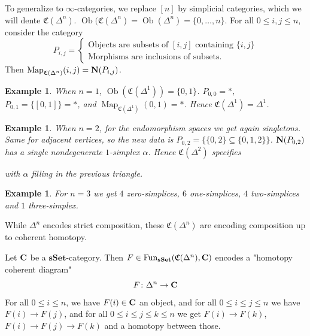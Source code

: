 \documentclass[A4paper, british, reqno]{amsart}
\theoremstyle{darkgreentheorem}
\theoremstyle{darkbluedefinition}
\theoremstyle{darkredexample}
\newtheorem{exa}[thm]{Example}
\theoremstyle{remark}
\DeclareMathOperator{\Fun}{Fun}
\DeclareMathOperator{\Ob}{Ob}
\DeclareMathOperator{\Map}{Map}
\newcommand{\sSet}{\mathbf{sSet}}
\newcommand{\1}{\mathbbm{1}}
\newcommand{\sub}{\subseteq}
\begin{document}
To generalize to $\infty$-categories, we replace $[n]$ by simplicial categories, which we will dente $\mathfrak{C}(\Delta^{n})$.
$\Ob(\mathfrak{C}(\Delta^{n})=\Ob(\Delta^{n})=\{0,\ldots,n\}$.
For all $0\leqslant i,j\leqslant n$, consider the category
\[ P_{i,j}=\begin{cases}
    \text{Objects are subsets of }[i,j]\text{ containing }\{i,j\} \\
    \text{Morphisms are inclusions of subsets.}
\end{cases}
\]
Then $\Map_{\mathfrak{C}(\Delta^{n})}(i,j)=\bfN(P_{i,j})$.

\begin{exa}
    When $n=1$, $\Ob(\mathfrak{C}(\Delta^{1}))=\{0,1\}$.
    $P_{0,0}=*$, $P_{0,1}=\{[0,1]\}=*$, and $\Map_{\mathfrak{C}(\Delta^{1})}(0,1)=*$.
    Hence $\mathfrak{C}(\Delta^{1})=\Delta^{1}$.
\end{exa}

\begin{exa}
    When $n=2$, for the endomorphism spaces we get again singletons.
    Same for adjacent vertices, so the new data is $P_{0,2}=\{ \{0,2\}\sub \{0,1,2\}\}$.
    $\mathbf{N}(P_{0,2})$ has a single nondegenerate $1$-simplex $\alpha$.
    Hence $\mathfrak{C}(\Delta^{2})$ specifies
    \begin{center}
    \end{center}
    with $\alpha$ filling in the previous triangle.
\end{exa}

\begin{exa}
    For $n=3$ we get $4$ zero-simplices, $6$ one-simplices, $4$ two-simplices and $1$ three-simplex.
\end{exa}

While $\Delta^{n}$ encodes strict composition, these $\mathfrak{C}(\Delta^{n})$ are encoding composition up to coherent homotopy.

Let $\mathbf{C}$ be a $\sSet$-category.
Then $F\in \Fun_{\sSet}(\mathfrak{C}(\Delta^{n}),\bfC)$ encodes a "homotopy coherent diagram"
\[ F\colon \Delta^{n}\to \mathbf{C} \]
For all $0\leqslant i\leqslant n$, we have $F(i)\in \mathbf{C}$ an object, and for all $0\leqslant i\leqslant j\leqslant n$ we have $F(i)\to F(j)$, and for all $0\leqslant i \leqslant j\leqslant k\leqslant n$ we get
$F(i)\to F(k)$, $F(i)\to F(j)\to F(k)$ and a homotopy between those.
\end{document}
